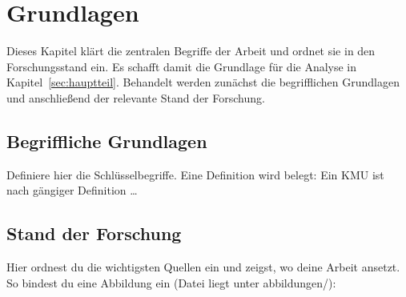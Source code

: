 \section{Grundlagen}
\label{sec:grundlagen}

Dieses Kapitel klärt die zentralen Begriffe der Arbeit und ordnet sie in den
Forschungsstand ein. Es schafft damit die Grundlage für die Analyse in
Kapitel~\ref{sec:hauptteil}. Behandelt werden zunächst die begrifflichen
Grundlagen und anschließend der relevante Stand der Forschung.

\subsection{Begriffliche Grundlagen}
\label{subsec:begriffe}

Definiere hier die Schlüsselbegriffe. Eine Definition wird belegt:
Ein \ac{KMU} ist nach gängiger Definition \dots\autocite[Vgl.][S.~3]{musterinstitut2023}

\subsection{Stand der Forschung}
\label{subsec:forschungsstand}

Hier ordnest du die wichtigsten Quellen ein und zeigst, wo deine Arbeit
ansetzt. So bindest du eine Abbildung ein (Datei liegt unter abbildungen/):


